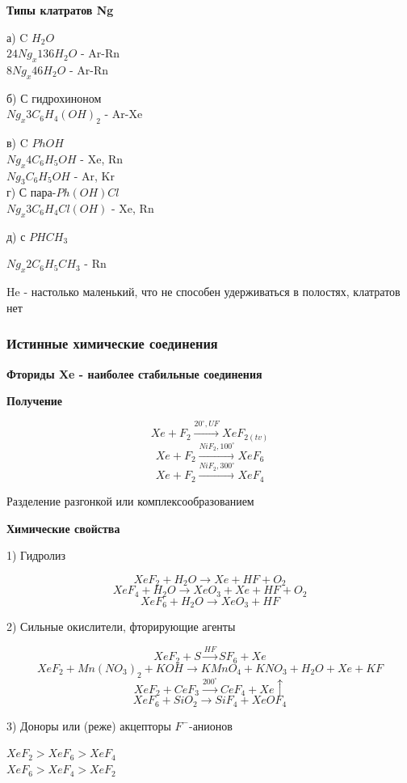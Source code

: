 \documentclass[14pt,a4paper]{scrartcl}
\begin{document}
\textbf{Типы клатратов Ng}

а)  C $H_2O$\\

$24Ng_x136H_2O$ - Ar-Rn\\
$8Ng_x46H_2O$ - Ar-Rn

б)  С гидрохиноном\\

$Ng_x3C_6H_4(OH)_2$ - Ar-Xe

в) C $PhOH$\\

$Ng_x4C_6H_5OH$ - Xe, Rn\\
$Ng_3C_6H_5OH$ -  Ar, Kr\\

г) С пара-$Ph(OH)Cl$\\

$Ng_x3C_6H_4Cl(OH)$ - Xe, Rn

д) с $PHCH_3$

$Ng_x2C_6H_5CH_3$ - Rn

He - настолько маленький, что не способен удерживаться в полостях, клатратов нет

\subsubsection{Истинные химические соединения}

\textbf{Фториды Xe - наиболее стабильные соединения}

\textbf{Получение}

$$Xe + F_2 \xrightarrow{20^{\circ}, UF} XeF_{2(tv)}$$
$$Xe + F_2 \xrightarrow{NiF_2, 100^{\circ}} XeF_6$$
$$Xe + F_2 \xrightarrow{NiF_2, 300^{\circ}}XeF_4$$

Разделение разгонкой или комплексообразованием

\textbf{Химические свойства}

1) Гидролиз

$$XeF_2 + H_2O \rightarrow Xe + HF + O_2$$
$$XeF_4  + H_2O \rightarrow XeO_3 + Xe + HF + O_2$$
$$XeF_6 + H_2O \rightarrow XeO_3 + HF$$

2) Сильные окислители, фторирующие агенты

$$XeF_2 + S \xrightarrow{HF} SF_6 + Xe$$
$$XeF_2 + Mn(NO_3)_2 + KOH \rightarrow KMnO_4 + KNO_3 + H_2O + Xe + KF$$
$$XeF_2 + CeF_3 \xrightarrow{200^{\circ}} CeF_4 + Xe\uparrow$$
$$XeF_6 + SiO_2 \rightarrow SiF_4 + XeOF_4$$

3) Доноры или (реже) акцепторы $F^-$-анионов

$XeF_2> XeF_6 > XeF_4$\\
$XeF_6 > XeF_4 > XeF_2$
\end{document}

